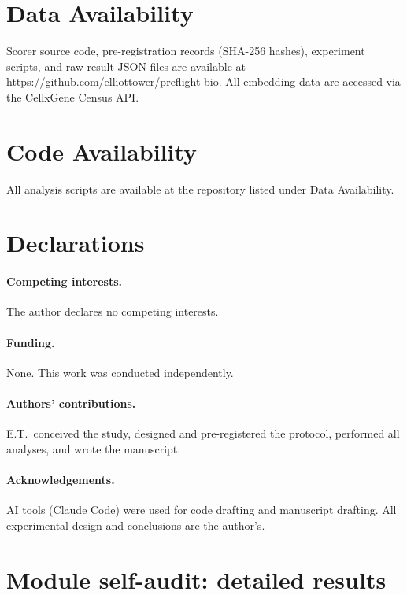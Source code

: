 \documentclass[11pt]{article}
\begin{document}
\section*{Data Availability}

Scorer source code, pre-registration records (SHA-256 hashes), experiment scripts, and raw result JSON files are available at \url{https://github.com/elliottower/preflight-bio}. All embedding data are accessed via the CellxGene Census API.

\section*{Code Availability}

All analysis scripts are available at the repository listed under Data Availability.

\section*{Declarations}

\paragraph{Competing interests.} The author declares no competing interests.

\paragraph{Funding.} None. This work was conducted independently.

\paragraph{Authors' contributions.} E.T.\ conceived the study, designed and pre-registered the protocol, performed all analyses, and wrote the manuscript.

\paragraph{Acknowledgements.} AI tools (Claude Code) were used for code drafting and manuscript drafting. All experimental design and conclusions are the author's.


\appendix

\section{Module self-audit: detailed results}
\label{app:modules}
\end{document}
